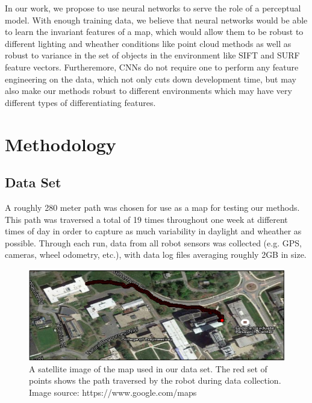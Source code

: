 \documentclass[letterpaper, 12 pt, conference]{ieeeconf}  %
\begin{document}
\par
In our work, we propose to use neural networks to serve the role of a perceptual model. With enough training data, we believe that neural networks would be able to learn the invariant features of a map, which would allow them to be robust to different lighting and wheather conditions like point cloud methods as well as robust to variance in the set of objects in the environment like SIFT and SURF feature vectors. Furtheremore, CNNs do not require one to perform any feature engineering on the data, which not only cuts down development time, but may also make our methods robust to different environments which may have very different types of differentiating features. 

\section{Methodology}

\subsection{Data Set}
A roughly 280 meter path was chosen for use as a map for testing our methods. This path was traversed a total of 19 times throughout one week at different times of day in order to capture as much variability in daylight and wheather as possible. Through each run, data from all robot sensors was collected (e.g. GPS, cameras, wheel odometry, etc.), with data log files averaging roughly 2GB in size. 
\begin{figure}[h]
\centering
\includegraphics[scale=01.0]{map}
\caption{A satellite image of the map used in our data set. The red set of points shows the path traversed by the robot during data collection. Image source: https://www.google.com/maps}
\end{figure}
\end{document}
